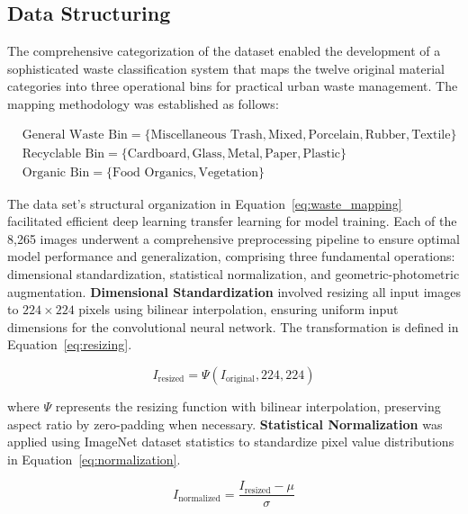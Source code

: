 \documentclass[final,5p,times,twocolumn]{elsarticle}
\begin{document}
\subsection{Data Structuring}
The comprehensive categorization of the dataset enabled the development of a sophisticated waste classification system that maps the twelve original material categories into three operational bins for practical urban waste management. The mapping methodology was established as follows:

\begin{equation}
\begin{split}
& \text{General Waste Bin} = \{\text{Miscellaneous Trash}, \text{Mixed}, \text{Porcelain}, \text{Rubber}, \text{Textile}\} \\
& \text{Recyclable Bin} = \{\text{Cardboard}, \text{Glass}, \text{Metal}, \text{Paper}, \text{Plastic}\} \\
& \text{Organic Bin} = \{\text{Food Organics}, \text{Vegetation}\}
 \end{split}
\label{eq:waste_mapping}
\end{equation}


The data set's structural organization in Equation~\ref{eq:waste_mapping} facilitated efficient deep learning transfer learning for model training. Each of the 8,265 images underwent a comprehensive preprocessing pipeline to ensure optimal model performance and generalization, comprising three fundamental operations: dimensional standardization, statistical normalization, and geometric-photometric augmentation. \noindent \textbf{Dimensional Standardization} involved resizing all input images to $224 \times 224$ pixels using bilinear interpolation, ensuring uniform input dimensions for the convolutional neural network. The transformation is defined in Equation~\ref{eq:resizing}.

\begin{equation}
I_{\text{resized}} = \Psi(I_{\text{original}}, 224, 224)
\label{eq:resizing}
\end{equation}

\noindent where $\Psi$ represents the resizing function with bilinear interpolation, preserving aspect ratio by zero-padding when necessary. \noindent \textbf{Statistical Normalization} was applied using ImageNet dataset statistics to standardize pixel value distributions in Equation~\ref{eq:normalization}.

\begin{equation}
I_{\text{normalized}} = \frac{I_{\text{resized}} - \mu}{\sigma}
\label{eq:normalization}
\end{equation}
\end{document}
